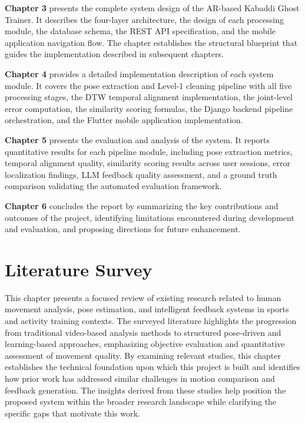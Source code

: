 \documentclass[12pt, a4paper]{report}
\begin{document}
\textbf{Chapter 3} presents the complete system design of the AR-based Kabaddi Ghost Trainer. It describes the four-layer architecture, the design of each processing module, the database schema, the REST API specification, and the mobile application navigation flow. The chapter establishes the structural blueprint that guides the implementation described in subsequent chapters.

\textbf{Chapter 4} provides a detailed implementation description of each system module. It covers the pose extraction and Level-1 cleaning pipeline with all five processing stages, the DTW temporal alignment implementation, the joint-level error computation, the similarity scoring formulas, the Django backend pipeline orchestration, and the Flutter mobile application implementation.

\textbf{Chapter 5} presents the evaluation and analysis of the system. It reports quantitative results for each pipeline module, including pose extraction metrics, temporal alignment quality, similarity scoring results across user sessions, error localization findings, LLM feedback quality assessment, and a ground truth comparison validating the automated evaluation framework.

\textbf{Chapter 6} concludes the report by summarizing the key contributions and outcomes of the project, identifying limitations encountered during development and evaluation, and proposing directions for future enhancement.

\chapter{Literature Survey}

This chapter presents a focused review of existing research related to human movement analysis, pose estimation, and intelligent feedback systems in sports and activity training contexts. The surveyed literature highlights the progression from traditional video-based analysis methods to structured pose-driven and learning-based approaches, emphasizing objective evaluation and quantitative assessment of movement quality. By examining relevant studies, this chapter establishes the technical foundation upon which this project is built and identifies how prior work has addressed similar challenges in motion comparison and feedback generation. The insights derived from these studies help position the proposed system within the broader research landscape while clarifying the specific gaps that motivate this work.
\end{document}

